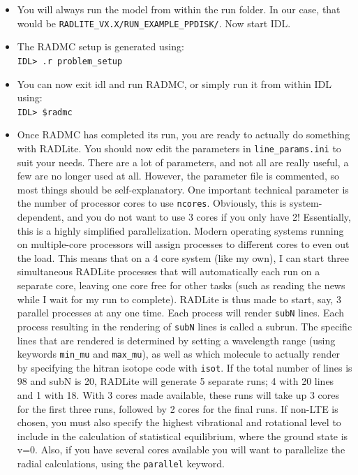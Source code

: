 \documentclass[11pt]{article}
\begin{document}
\begin{itemize}
\item You will always run the model from within the run folder. In our case, that would be {\tt RADLITE\_VX.X/RUN\_EXAMPLE\_PPDISK/}. 
Now start IDL. 

\item The RADMC setup is generated using: \\
{\tt IDL> .r problem\_setup}

\item You can now exit idl and run RADMC, or simply run it from within IDL using: \\
{\tt IDL> \$radmc}

\item Once RADMC has completed its run, you are ready to actually do something with RADLite. You should now edit the parameters in {\tt line\_params.ini} to suit your needs. 
There are a lot of parameters, and not all are really useful, a few are no longer used at all. However, the parameter file is commented, so
most things should be self-explanatory. One important technical parameter is the number of processor cores to use {\tt ncores}. Obviously, this
is system-dependent, and you do not want to use 3 cores if you only have 2! Essentially, this is a highly simplified parallelization. Modern operating systems
running on multiple-core processors will assign processes to different cores to even out the load. This means that on a 4 core system (like my own), I can
start three simultaneous RADLite processes that will automatically each run on a separate core, leaving one core free for other tasks (such as reading the news while
I wait for my run to complete). RADLite is thus made to start, say, 3 parallel processes at any one time. Each process will render {\tt subN} lines. Each 
process resulting in the rendering of {\tt subN} lines is called a subrun. The specific lines that are rendered
is determined by setting a wavelength range (using keywords {\tt min\_mu} and {\tt max\_mu}), as well as which molecule to actually render by specifying the hitran isotope code
with {\tt isot}. If the total number of lines is 98 and subN is 20, RADLite will generate 5 separate runs; 4 with 20 lines and 1 with 18. With 3 cores made available, these runs will 
take up 3 cores for the first three runs, followed by 2 cores for the final runs.  If non-LTE is chosen, you must also specify the highest vibrational and rotational level to include in the calculation of statistical equilibrium, where the ground state is v=0.  Also, if you have several cores available you will want to parallelize the radial calculations, using the {\tt parallel} keyword.


\end{itemize}
\end{document}
